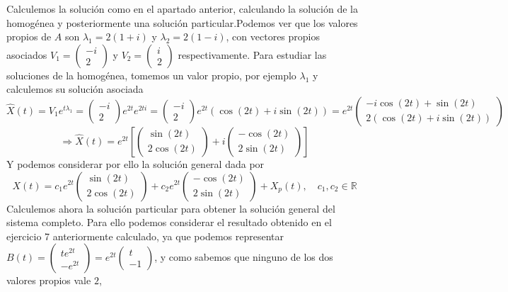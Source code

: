 \documentclass[fleqn]{article}
\def\R{\mathds{R}}
\begin{document}
    Calculemos la solución como en el apartado anterior, calculando la solución de la homogénea y posteriormente una solución particular.Podemos ver que los valores propios 
    de $A$ son $\lambda_1=2(1+i)$ y $\lambda_2=2(1-i)$, con vectores propios asociados $V_1 = \begin{pmatrix} -i \\ 2 \end{pmatrix}$ y $V_2 = \begin{pmatrix} i \\ 2 \end{pmatrix}$
    respectivamente. Para estudiar las soluciones de la homogénea, tomemos un valor propio, por ejemplo $\lambda_1$ y calculemos su solución asociada
    $$\hat{X}(t) = V_1e^{t\lambda_1} = \begin{pmatrix} -i \\ 2 \end{pmatrix} e^{2t} e^{2ti} = \begin{pmatrix} -i \\ 2 \end{pmatrix} e^{2t} (\cos(2t) + i\sin(2t))=
    e^{2t} \begin{pmatrix} 
        -i\cos(2t) + \sin(2t)\\
        2(\cos(2t) + i\sin(2t))
    \end{pmatrix}
    $$
    $$\Rightarrow \hat{X}(t) = e^{2t}\left[
    \begin{pmatrix}
        \sin(2t)\\
        2\cos(2t)
    \end{pmatrix}
    + i
    \begin{pmatrix}
        -\cos(2t)\\
        2\sin(2t)
    \end{pmatrix}
    \right]
    $$
    Y podemos considerar por ello la solución general dada por 
    $$
    X(t) = c_1 e^{2t}
    \begin{pmatrix}
        \sin(2t)\\
        2\cos(2t)
    \end{pmatrix}
    + c_2 e^{2t}
    \begin{pmatrix}
        -\cos(2t)\\
        2\sin(2t)
    \end{pmatrix}
    +X_p(t), \quad c_1,c_2 \in \R
    $$
    Calculemos ahora la solución particular para obtener la solución general del sistema completo. Para ello podemos considerar el resultado obtenido en el ejercicio 7 anteriormente calculado,
    ya que podemos representar $B(t)=\begin{pmatrix} te^{2t} \\ -e^{2t} \end{pmatrix} = e^{2t}\begin{pmatrix} t \\ -1 \end{pmatrix}$, y como sabemos que ninguno de los dos valores propios vale $2$,
\end{document}

